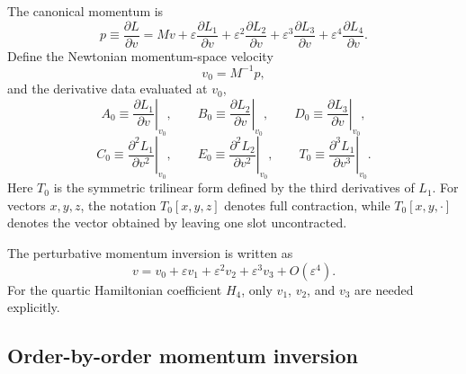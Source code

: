 \documentclass[11pt]{article}
\begin{document}
The canonical momentum is
\begin{equation}
p\equiv \frac{\partial L}{\partial v}
= Mv
+\varepsilon\frac{\partial L_1}{\partial v}
+\varepsilon^2\frac{\partial L_2}{\partial v}
+\varepsilon^3\frac{\partial L_3}{\partial v}
+\varepsilon^4\frac{\partial L_4}{\partial v}.
\label{eq:app-4pn-quartic-legendre-momentum}
\end{equation}
Define the Newtonian momentum-space velocity
\begin{equation}
v_0=M^{-1}p,
\label{eq:app-4pn-quartic-legendre-v0}
\end{equation}
and the derivative data evaluated at \(v_0\),
\begin{equation}
A_0\equiv \left.\frac{\partial L_1}{\partial v}\right|_{v_0},
\qquad
B_0\equiv \left.\frac{\partial L_2}{\partial v}\right|_{v_0},
\qquad
D_0\equiv \left.\frac{\partial L_3}{\partial v}\right|_{v_0},
\label{eq:app-4pn-quartic-legendre-ABD}
\end{equation}
\begin{equation}
C_0\equiv \left.\frac{\partial^2L_1}{\partial v^2}\right|_{v_0},
\qquad
E_0\equiv \left.\frac{\partial^2L_2}{\partial v^2}\right|_{v_0},
\qquad
T_0\equiv \left.\frac{\partial^3L_1}{\partial v^3}\right|_{v_0}.
\label{eq:app-4pn-quartic-legendre-CET}
\end{equation}
Here \(T_0\) is the symmetric trilinear form defined by the third derivatives of
\(L_1\).  For vectors \(x,y,z\), the notation \(T_0[x,y,z]\) denotes full
contraction, while \(T_0[x,y,\cdot]\) denotes the vector obtained by leaving
one slot uncontracted.

The perturbative momentum inversion is written as
\begin{equation}
v=v_0+\varepsilon v_1+\varepsilon^2v_2+\varepsilon^3v_3+O(\varepsilon^4).
\label{eq:app-4pn-quartic-legendre-v-series}
\end{equation}
For the quartic Hamiltonian coefficient \(H_4\), only \(v_1\), \(v_2\), and
\(v_3\) are needed explicitly.

\subsection{Order-by-order momentum inversion}
\label{app:quartic-legendre-inversion}
\end{document}
